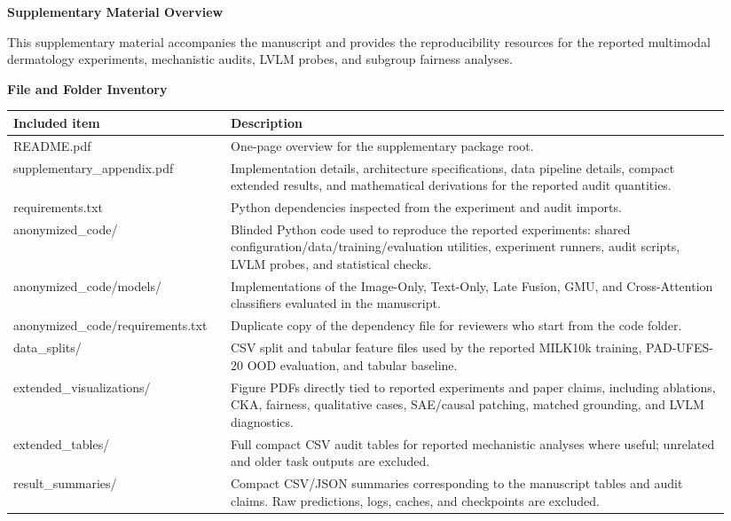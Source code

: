 \documentclass[10pt]{article}
\begin{document}
\color{textgray}

{\LARGE\bfseries Supplementary Material Overview}

\vspace{4pt}
This supplementary material accompanies the manuscript and provides the reproducibility resources for the reported multimodal dermatology experiments, mechanistic audits, LVLM probes, and subgroup fairness analyses.

\vspace{6pt}
{\bfseries File and Folder Inventory}

\small
\begin{tabular}{>{\raggedright\arraybackslash}p{0.28\linewidth}>{\raggedright\arraybackslash}p{0.66\linewidth}}
\toprule
\rowcolor{headergray}\textbf{Included item} & \textbf{Description} \\
\midrule
README.pdf & One-page overview for the supplementary package root. \\
supplementary\_appendix.pdf & Implementation details, architecture specifications, data pipeline details, compact extended results, and mathematical derivations for the reported audit quantities. \\
requirements.txt & Python dependencies inspected from the experiment and audit imports. \\
anonymized\_code/ & Blinded Python code used to reproduce the reported experiments: shared configuration/data/training/evaluation utilities, experiment runners, audit scripts, LVLM probes, and statistical checks. \\
anonymized\_code/models/ & Implementations of the Image-Only, Text-Only, Late Fusion, GMU, and Cross-Attention classifiers evaluated in the manuscript. \\
anonymized\_code/requirements.txt & Duplicate copy of the dependency file for reviewers who start from the code folder. \\
data\_splits/ & CSV split and tabular feature files used by the reported MILK10k training, PAD-UFES-20 OOD evaluation, and tabular baseline. \\
extended\_visualizations/ & Figure PDFs directly tied to reported experiments and paper claims, including ablations, CKA, fairness, qualitative cases, SAE/causal patching, matched grounding, and LVLM diagnostics. \\
extended\_tables/ & Full compact CSV audit tables for reported mechanistic analyses where useful; unrelated and older task outputs are excluded. \\
result\_summaries/ & Compact CSV/JSON summaries corresponding to the manuscript tables and audit claims. Raw predictions, logs, caches, and checkpoints are excluded. \\
\bottomrule
\end{tabular}
\end{document}
